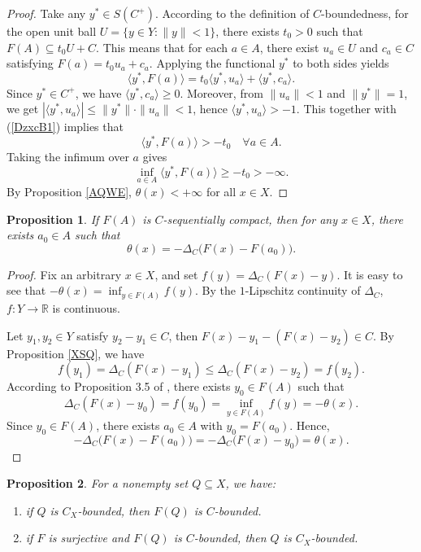 \documentclass[10pt,a4paper]{amsart}
\newtheorem{proposition}{Proposition}[section]
\begin{document}
\begin{proof}
	Take any $y^*\in S(C^+)$. According to the definition of $C$-boundedness, for    the open unit ball $U = \{y\in Y : \|y\| < 1\}$,  there exists $t_0 > 0$ such that
$	F(A) \subseteq t_0 U + C .$
	This means that for each $a\in A$, there exist $u_a \in U$ and $c_a \in C$ satisfying
$	F(a) = t_0 u_a + c_a .$
	Applying the functional $y^*$ to both sides yields
\begin{equation}\label{DzxcB1}
	\langle y^*, F(a)\rangle = t_0\langle y^*, u_a\rangle + \langle y^*, c_a\rangle .
 \end{equation}
	Since $y^*\in C^+$, we have $\langle y^*, c_a\rangle \ge 0$. Moreover, from $\|u_a\| < 1$ and $\|y^*\| = 1$, we get $|\langle y^*, u_a\rangle| \le \|y^*\|\cdot\|u_a\| < 1$, hence $\langle y^*, u_a\rangle > -1$. This together with  (\ref{DzxcB1})   implies that 
	\[
	\langle y^*, F(a)\rangle > -t_0 \quad \forall a\in A .
	\]
	Taking the infimum over $a$ gives
	\[
	\inf_{a\in A} \langle y^*, F(a)\rangle \ge -t_0 > -\infty .
	\]
	By Proposition \ref{AQWE}, $\theta(x)<+\infty$ for all $x\in X$.
\end{proof}

\begin{proposition}\label{XLJKD}
	If $F(A)$ is $C$-sequentially compact, then for any $x\in X$, there exists $a_0 \in A$ such that
	$$\theta(x) =  - {\Delta _C}\bigl( F(x) - F(a_0)\bigr).$$
\end{proposition}

\begin{proof}
	Fix an arbitrary $x\in X$, and set $f(y) = \Delta_C(F(x) - y)$.  It is easy to see  that $-\theta(x) = \inf_{y \in F(A)} f(y)$.
	By the $1$-Lipschitz continuity of $\Delta_C$, $f: Y \to \mathbb{R}$ is continuous.
	
	Let $y_1, y_2 \in Y$ satisfy $y_2 - y_1 \in C$, then $F(x) - y_1 - (F(x) - y_2) \in C$. By Proposition \ref{XSQ}, we have
	$$f(y_1) = {\Delta _C}(F(x) - y_1) \le {\Delta _C}(F(x) - y_2) = f(y_2).$$
	According to Proposition 3.5 of \cite{Han2025}, there exists $y_0 \in F(A)$ such that
	$${\Delta _C}(F(x) - y_0) = f(y_0) = \inf_{y \in F(A)} f(y) = -\theta(x).$$
	Since $y_0 \in F(A)$, there exists $a_0 \in A$ with $y_0 = F(a_0)$. Hence,
	$$- {\Delta _C}\bigl( F(x) - F(a_0)\bigr) = - {\Delta _C}\bigl( F(x) - y_0\bigr) = \theta(x).$$
\end{proof}

\begin{proposition} \label{QQB} 
	For a nonempty set $Q \subseteq X$, we have:
	\begin{enumerate}
		\item[(i)] if $Q$ is $C_X$-bounded, then $F(Q)$ is $C$-bounded.
		\item[(ii)] if $F$ is surjective  and   $F(Q)$ is $C$-bounded, then  $Q$ is $C_X$-bounded.
	\end{enumerate}
\end{proposition}
\end{document}
